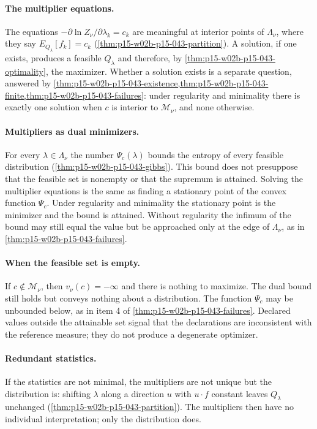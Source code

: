 \paragraph{The multiplier equations.}
The equations \(-\partial\ln Z_\nu/\partial\lambda_k=c_k\) are meaningful at
interior points of \(\Lambda_\nu\), where they say
\(E_{Q_\lambda}[f_k]=c_k\) (\cref{thm:p15-w02b-p15-043-partition}).
A solution, if one exists, produces a feasible \(Q_\lambda\) and therefore,
by \cref{thm:p15-w02b-p15-043-optimality}, the maximizer. Whether a solution
exists is a separate question, answered by
\cref{thm:p15-w02b-p15-043-existence,thm:p15-w02b-p15-043-finite,thm:p15-w02b-p15-043-failures}:
under regularity and minimality there is exactly one solution when \(c\) is
interior to \(\mathcal M_\nu\), and none otherwise.

\paragraph{Multipliers as dual minimizers.}
For every \(\lambda\in\Lambda_\nu\) the number \(\Psi_c(\lambda)\) bounds the
entropy of every feasible distribution
(\cref{thm:p15-w02b-p15-043-gibbs}). This bound does not presuppose that the
feasible set is nonempty or that the supremum is attained. Solving the
multiplier equations is the same as finding a stationary point of the convex
function \(\Psi_c\). Under regularity and minimality the stationary point is
the minimizer and the bound is attained. Without regularity the infimum of
the bound may still equal the value but be approached only at the edge of
\(\Lambda_\nu\), as in \cref{thm:p15-w02b-p15-043-failures}.

\paragraph{When the feasible set is empty.}
If \(c\notin\mathcal M_\nu\), then \(v_\nu(c)=-\infty\) and there is nothing
to maximize. The dual bound still holds but conveys nothing about a
distribution. The function \(\Psi_c\) may be unbounded below, as in item 4 of
\cref{thm:p15-w02b-p15-043-failures}. Declared values
outside the attainable set signal that the declarations are inconsistent
with the reference measure; they do not produce a degenerate optimizer.

\paragraph{Redundant statistics.}
If the statistics are not minimal, the multipliers are not unique but the
distribution is: shifting \(\lambda\) along a direction \(u\) with \(u\cdot f\)
constant leaves \(Q_\lambda\) unchanged
(\cref{thm:p15-w02b-p15-043-partition}). The multipliers then have no
individual interpretation; only the distribution does.

